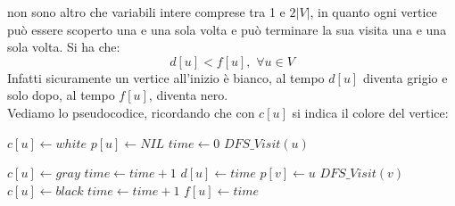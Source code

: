 \documentclass[a4paper,12pt, oneside]{book}
\begin{document}
non sono altro che variabili intere comprese tra 1 e $2|V|$, in quanto
ogni vertice può essere scoperto una e una sola volta e può terminare
la sua visita una e una sola volta. Si ha che:
\[d[u]<f[u],\,\,\forall u\in V\]
Infatti sicuramente un vertice all'inizio è bianco, al tempo $d[u]$
diventa grigio e solo dopo, al tempo $f[u]$, diventa nero.\\
Vediamo lo pseudocodice, ricordando che con $c[u]$ si indica il colore
del vertice:
\begin{shaded}
  \begin{algorithmic}
    \State $c[u]\gets white$
    \State $p[u]\gets NIL$
    \EndFor
    \State $time \gets 0$
    \State $DFS\_Visit(u)$
    \EndIf
    \EndFor
    \EndFunction

    
    \State $c[u] \gets gray$
    \State $time \gets time +1$
    \State $d[u] \gets time$
    \For {$\forall v \in Adj[u$}
    \State $p[v] \gets u$
    \State $DFS\_Visit(v)$
    \EndIf
    \EndFor
    \State $c[u] \gets black$
    \State $time \gets time +1$
    \State $f[u] \gets time$
    \EndFunction
  \end{algorithmic}
\end{shaded}
\end{document}
